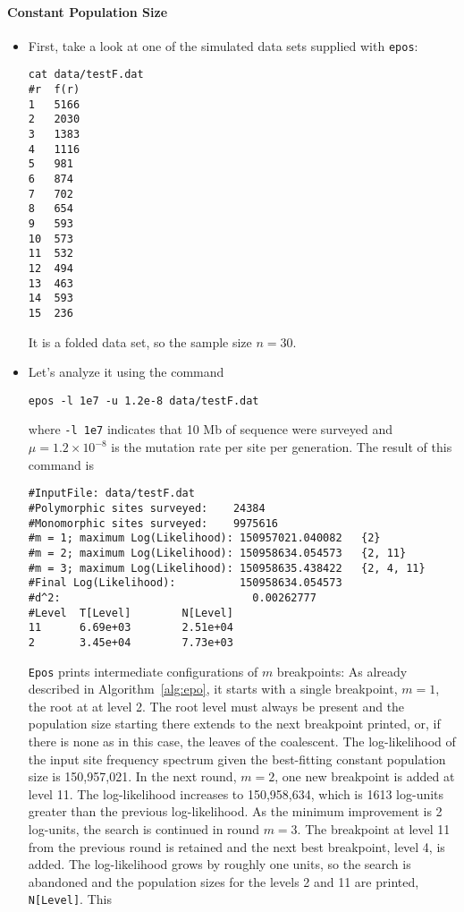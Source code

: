 \documentclass[a4paper, english]{article}
\newcommand{\ty}{\texttt}
\begin{document}
\paragraph{Constant Population Size}
\begin{itemize}
\item First, take a look at one of the simulated data sets supplied
  with \ty{epos}:
\begin{verbatim}
cat data/testF.dat 
#r	f(r)
1	5166
2	2030
3	1383
4	1116
5	981
6	874
7	702
8	654
9	593
10	573
11	532
12	494
13	463
14	593
15	236
\end{verbatim}
It is a folded data set, so the sample size $n=30$.
\item Let's analyze it using the command
\begin{verbatim}
epos -l 1e7 -u 1.2e-8 data/testF.dat 
\end{verbatim}
where \ty{-l 1e7} indicates that 10 Mb of sequence were surveyed and
$\mu=1.2\times 10^{-8}$ is the mutation rate per site per generation. The result of this command is
\begin{verbatim}
#InputFile:	data/testF.dat
#Polymorphic sites surveyed:	24384
#Monomorphic sites surveyed:	9975616
#m = 1; maximum Log(Likelihood): 150957021.040082	{2}
#m = 2; maximum Log(Likelihood): 150958634.054573	{2, 11}
#m = 3; maximum Log(Likelihood): 150958635.438422	{2, 4, 11}
#Final Log(Likelihood):          150958634.054573
#d^2:                              0.00262777
#Level  T[Level]        N[Level]
11      6.69e+03        2.51e+04
2       3.45e+04        7.73e+03
\end{verbatim}
\ty{Epos} prints intermediate configurations of $m$ breakpoints: As
already described in Algorithm~\ref{alg:epo}, it starts with a single
breakpoint, $m=1$, the root at at level 2. The root level must always
be present and the population size starting there extends to the next
breakpoint printed, or, if there is none as in this case, the leaves
of the coalescent. The log-likelihood of the input site frequency
spectrum given the best-fitting constant population size is
150,957,021. In the next round, $m=2$, one new breakpoint is added at
level 11. The log-likelihood increases to 150,958,634, which is 
1613 log-units greater than the previous log-likelihood. As the minimum
improvement is 2 log-units, the search is continued in round
$m=3$. The breakpoint at level 11 from the previous round is retained
and the next best breakpoint, level 4, is added. The log-likelihood
grows by roughly one units, so the search is abandoned and the
population sizes for the levels 2 and 11 are printed, \ty{N[Level]}. This

\end{itemize}
\end{document}
